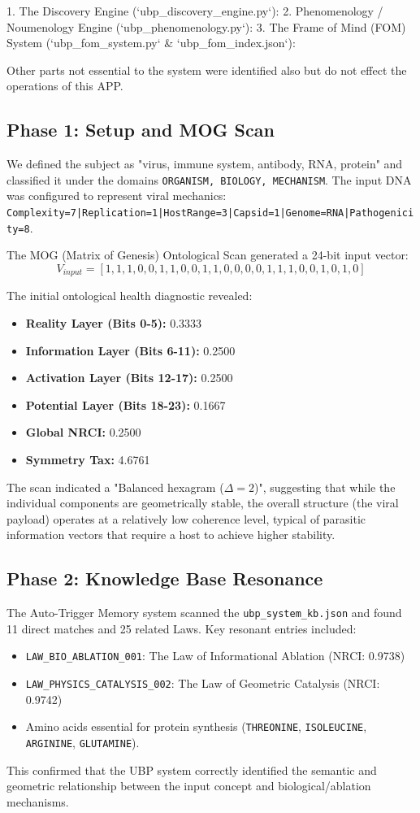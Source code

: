 \documentclass[11pt,a4paper]{article}
\begin{document}
1. The Discovery Engine (`ubp_discovery_engine.py`):
2. Phenomenology / Noumenology Engine (`ubp_phenomenology.py`):
3. The Frame of Mind (FOM) System (`ubp_fom_system.py` & `ubp_fom_index.json`):

Other parts not essential to the system were identified also but do not effect the operations of this APP.


\subsection{Phase 1: Setup and MOG Scan}
We defined the subject as "virus, immune system, antibody, RNA, protein" and classified it under the domains \texttt{ORGANISM, BIOLOGY, MECHANISM}. The input DNA was configured to represent viral mechanics: \texttt{Complexity=7|Replication=1|HostRange=3|Capsid=1|Genome=RNA|Pathogenicity=8}.

The MOG (Matrix of Genesis) Ontological Scan generated a 24-bit input vector:
\[ V_{input} = [1, 1, 1, 0, 0, 1, 1, 0, 0, 1, 1, 0, 0, 0, 0, 1, 1, 1, 0, 0, 1, 0, 1, 0] \]

The initial ontological health diagnostic revealed:
\begin{itemize}
    \item \textbf{Reality Layer (Bits 0-5):} 0.3333
    \item \textbf{Information Layer (Bits 6-11):} 0.2500
    \item \textbf{Activation Layer (Bits 12-17):} 0.2500
    \item \textbf{Potential Layer (Bits 18-23):} 0.1667
    \item \textbf{Global NRCI:} 0.2500
    \item \textbf{Symmetry Tax:} 4.6761
\end{itemize}
The scan indicated a "Balanced hexagram ($\Delta=2$)", suggesting that while the individual components are geometrically stable, the overall structure (the viral payload) operates at a relatively low coherence level, typical of parasitic information vectors that require a host to achieve higher stability.

\subsection{Phase 2: Knowledge Base Resonance}
The Auto-Trigger Memory system scanned the \texttt{ubp\_system\_kb.json} and found 11 direct matches and 25 related Laws. Key resonant entries included:
\begin{itemize}
    \item \texttt{LAW\_BIO\_ABLATION\_001}: The Law of Informational Ablation (NRCI: 0.9738)
    \item \texttt{LAW\_PHYSICS\_CATALYSIS\_002}: The Law of Geometric Catalysis (NRCI: 0.9742)
    \item Amino acids essential for protein synthesis (\texttt{THREONINE}, \texttt{ISOLEUCINE}, \texttt{ARGININE}, \texttt{GLUTAMINE}).
\end{itemize}
This confirmed that the UBP system correctly identified the semantic and geometric relationship between the input concept and biological/ablation mechanisms.
\end{document}
